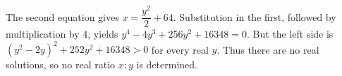 The second equation gives $x=\dfrac{y^2}{2}+64$. Substitution in the first, followed by multiplication by 4, yields $y^4-4y^3+256y^2+16348=0$. But the left side is $(y^2-2y)^2+252y^2+16348>0$ for every real $y$. Thus there are no real solutions, so no real ratio $x:y$ is determined.
